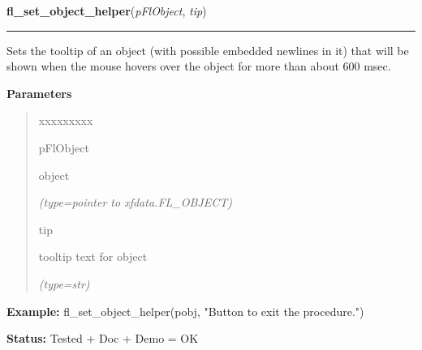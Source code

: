 \hspace{.8\funcindent}\begin{boxedminipage}{\funcwidth}

    \raggedright \textbf{fl\_set\_object\_helper}(\textit{pFlObject}, \textit{tip})

    \vspace{-1.5ex}

    \rule{\textwidth}{0.5\fboxrule}
\setlength{\parskip}{2ex}
    Sets the tooltip of an object (with possible embedded newlines in it) 
    that will be shown when the mouse hovers over the object for more than 
    about 600 msec.

\setlength{\parskip}{1ex}
      \textbf{Parameters}
      \vspace{-1ex}

      \begin{quote}
        \begin{Ventry}{xxxxxxxxx}

          \item[pFlObject]

          object

            {\it (type=pointer to xfdata.FL\_OBJECT)}

          \item[tip]

          tooltip text for object

            {\it (type=str)}

        \end{Ventry}

      \end{quote}

\textbf{Example:} fl\_set\_object\_helper(pobj, "Button to exit the procedure.")



\textbf{Status:} Tested + Doc + Demo = OK



    \end{boxedminipage}

    \label{xformslib:flbasic:fl_set_object_position}

    \vspace{0.5ex}

